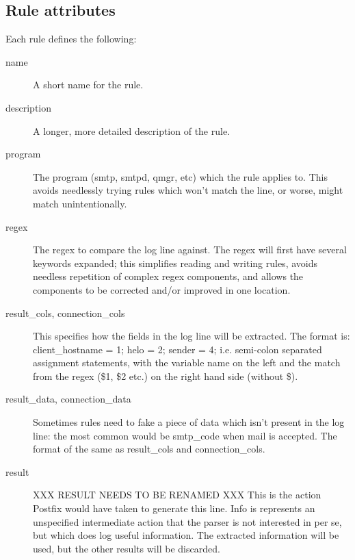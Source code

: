 \documentclass[a4paper,12pt,draft]{article}
\begin{document}
\subsection{Rule attributes}

Each rule defines the following:

\begin{description}

    \item [name] A short name for the rule.

    \item [description] A longer, more detailed description of the rule.

    \item [program] The program (smtp, smtpd, qmgr, etc) which the rule
        applies to.  This avoids needlessly trying rules which won't
        match the line, or worse, might match unintentionally.

    \item [regex] The regex to compare the log line against.  The regex
        will first have several keywords expanded; this simplifies reading
        and writing rules, avoids needless repetition of complex regex
        components, and allows the components to be corrected and/or
        improved in one location.

    \item [result\_cols, connection\_cols] This specifies how the fields in
        the log line will be extracted.  The format is: \newline
        client\_hostname = 1; helo = 2; sender = 4; \newline
        i.e.  semi-colon separated assignment statements, with the variable
        name on the left and the match from the regex (\$1, \$2 etc.) on the
        right hand side (without \$).

    \item [result\_data, connection\_data] Sometimes rules need to fake
        a piece of data which isn't present in the log line: the most
        common would be smtp\_code when mail is accepted.  The format of
        the same as result\_cols and connection\_cols.

    \item [result]  XXX RESULT NEEDS TO BE RENAMED XXX This is the action
        Postfix would have taken to generate this line.  Info is represents
        an unspecified intermediate action that the parser is not
        interested in per se, but which does log useful information.  The
        extracted information will be used, but the other results will be
        discarded.


\end{description}
\end{document}

